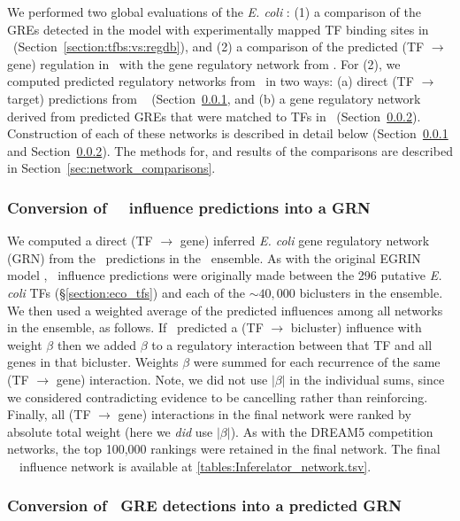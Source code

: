 We performed two global evaluations of the {\it E. coli} \egrine: (1)
a comparison of the GREs detected in the model with experimentally
mapped TF binding sites in \rdb~(Section~\ref{section:tfbs:vs:regdb}),
and (2) a comparison of the predicted (TF $\rightarrow$ gene) regulation
in \egrine~with the gene regulatory network from
\cite{Marbach2012}. For (2), we computed predicted regulatory networks
from \egrine~in two ways: (a) direct (TF $\rightarrow$ target)
predictions from \nwinf~ (Section~\ref{sec:nwinf_network}, and (b) a
gene regulatory network derived from predicted GREs that were matched
to TFs in
\rdb~(Section~\ref{section:gre_grn_construction}). Construction of
each of these networks is described in detail below
(Section~\ref{sec:nwinf_network} and
Section~\ref{section:gre_grn_construction}). The methods for, and
results of the comparisons are described in
Section~\ref{sec:network_comparisons}.

\subsubsection{Conversion of \egrine~\nwinf~influence predictions into a GRN}
\label{sec:nwinf_network}

We computed a direct (TF $\rightarrow$ gene) inferred {\it E. coli}
gene regulatory network (GRN) from the \nwinf~predictions in the
\egrine~ensemble. As with the original EGRIN model \cite{Bonneau2007},
\nwinf~influence predictions were originally made between the 296
putative {\it E. coli} TFs (\S\ref{section:eco_tfs}) and each of the
$\sim 40,000$ biclusters in the ensemble. We then used a weighted
average of the predicted influences among all networks in the
ensemble, as follows. If \nwinf~predicted a (TF $\rightarrow$
bicluster) influence with weight $\beta$ then we added $\beta$ to a
regulatory interaction between that TF and all genes in that
bicluster. Weights $\beta$ were summed for each recurrence of the same
(TF $\rightarrow$ gene) interaction. Note, we did not use $|\beta|$ in
the individual sums, since we considered contradicting evidence to be
cancelling rather than reinforcing. Finally, all (TF $\rightarrow$
gene) interactions in the final network were ranked by absolute total
weight (here we {\it did} use $|\beta|$). As with the DREAM5
competition networks, the top 100,000 rankings were retained in the
final network. The final \egrine~\nwinf~influence network is available
at \ref{tables:Inferelator_network.tsv}.

\subsubsection{Conversion of \egrine~GRE detections into a predicted GRN}
\label{section:gre_grn_construction}

